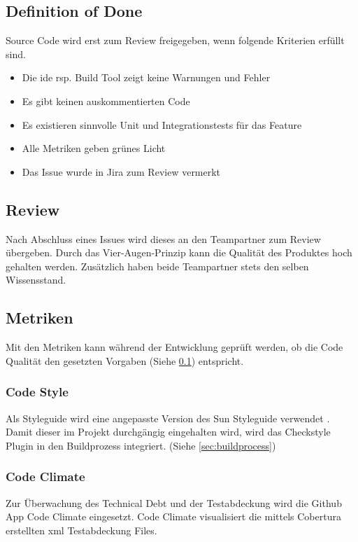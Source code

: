 \documentclass[11pt,a4paper,english,oneside]{book}
\numberwithin{equation}{chapter}
\begin{document}
	\subsection{Definition of Done} \label{ssec:dod}
	Source Code wird erst zum Review freigegeben, wenn folgende Kriterien erfüllt sind.
	\begin{itemize}
		\item Die \gls{ide} rsp. Build Tool zeigt keine Warnungen und Fehler
		\item Es gibt keinen auskommentierten Code
		\item Es existieren sinnvolle Unit und Integrationstests für das Feature
		\item Alle Metriken geben grünes Licht
		\item Das Issue wurde in Jira \cite{jira} zum Review vermerkt
	\end{itemize}
		
	\subsection{Review}
	Nach Abschluss eines Issues wird dieses an den Teampartner zum Review übergeben. Durch das Vier-Augen-Prinzip kann die Qualität des Produktes hoch gehalten werden. Zusätzlich haben beide Teampartner stets den selben Wissensstand.
	
	\subsection{Metriken} \label{ssec:metriken}
	Mit den Metriken kann während der Entwicklung geprüft werden, ob die Code Qualität den gesetzten Vorgaben (Siehe \ref{ssec:dod}) entspricht.
	
	\subsubsection{Code Style}
	Als Styleguide wird eine angepasste Version des Sun Styleguide verwendet \cite{suncheckstyle}. Damit dieser im Projekt durchgängig eingehalten wird, wird das Checkstyle Plugin \cite{checkstyle} in den Buildprozess integriert. (Siehe \ref{sec:buildprocess})	
	
	\subsubsection{Code Climate}
	Zur Überwachung des Technical Debt und der Testabdeckung wird die Github App Code Climate \cite{codeclimate} eingesetzt. Code Climate visualisiert die mittels Cobertura \cite{cobertura} erstellten \gls{xml} Testabdeckung Files.
	
\end{document}
